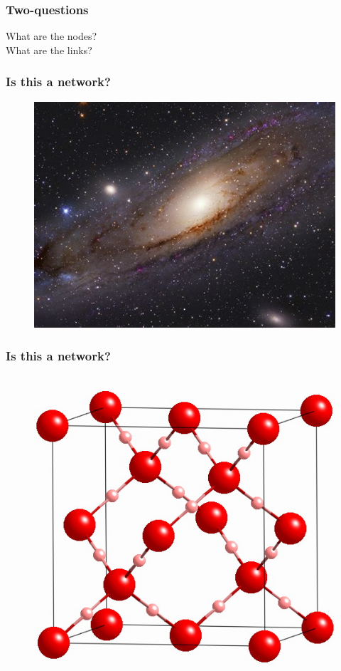 \documentclass{beamer}
\begin{document}
\begin{frame}
    \frametitle{Two-questions}
        \begin{center}
            {\huge What are the nodes?}\\
            \vspace{5em}
            {\huge What are the links?}
        \end{center}
\end{frame}
\begin{frame}
    \frametitle{Is this a network?}

\begin{figure}
    \begin{center}
        \includegraphics[width=0.6\columnwidth]{galaxy.jpeg}
    \end{center}
\end{figure}

\end{frame}
\begin{frame}
    \frametitle{Is this a network?}
\begin{figure}
    \begin{center}
        \includegraphics[width=0.4\columnwidth]{crystal.jpeg}
    \end{center}
\end{figure}
\end{frame}
\end{document}
